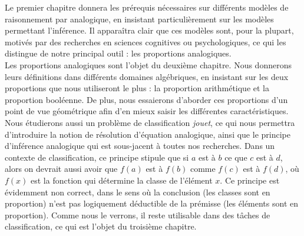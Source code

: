 Le premier chapitre donnera les prérequis nécessaires sur différents modèles de
raisonnement par analogique, en insistant particulièrement sur les modèles
permettant l'inférence. Il apparaîtra clair que ces modèles sont, pour la
plupart, motivés par des recherches en sciences cognitives ou psychologiques,
ce qui les distingue de notre principal outil : les proportions analogiques.\\

Les proportions analogiques sont l'objet du deuxième chapitre. Nous donnerons
leurs définitions dans différents domaines algébriques, en insistant sur les
deux proportions que nous utiliseront le plus : la proportion arithmétique et
la proportion booléenne. De plus, nous essaierons d'aborder ces proportions
d'un point de vue géométrique afin d'en mieux saisir les différentes
caractéristiques. Nous étudierons aussi un problème de classification
\textit{jouet}, ce qui nous permettra d'introduire la notion de résolution
d'équation analogique, ainsi que le principe d'inférence analogique qui est
sous-jacent à toutes  nos recherches. Dans un contexte de classification, ce
principe stipule que si $a$ est à $b$ ce que $c$ est à $d$, alors on devrait
aussi avoir que $f(a)$ est à $f(b)$ comme $f(c)$ est à $f(d)$, où $f(x)$ est la
fonction qui détermine la classe de l'élément $x$. Ce principe est évidemment
non correct, dans le sens où la conclusion (les classes sont en proportion)
n'est pas logiquement déductible de la prémisse (les éléments sont en
proportion). Comme nous le verrons, il reste utilisable dans des tâches de
classification, ce qui est l'objet du troisième chapitre.\\



